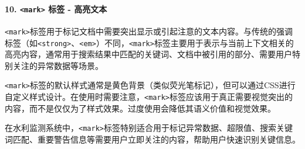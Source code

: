 \paragraph{\texorpdfstring{10. \texttt{\textless{}mark\textgreater{}} 标签 - 高亮文本}{10. \textless mark\textgreater{} 标签 - 高亮文本}}\label{mark-ux6807ux7b7e---ux9ad8ux4eaeux6587ux672c}

\texttt{\textless{}mark\textgreater{}}标签用于标记文档中需要突出显示或引起注意的文本内容。与传统的强调标签（如\texttt{\textless{}strong\textgreater{}}、\texttt{\textless{}em\textgreater{}}）不同，\texttt{\textless{}mark\textgreater{}}标签主要用于表示与当前上下文相关的高亮内容，通常用于搜索结果中匹配的关键词、文档中被引用的部分、需要用户特别关注的异常数据等场景。

\texttt{\textless{}mark\textgreater{}}标签的默认样式通常是黄色背景（类似荧光笔标记），但可以通过CSS进行自定义样式设计。在使用时需要注意，\texttt{\textless{}mark\textgreater{}}标签应该用于真正需要视觉突出的内容，而不是仅仅为了样式效果。过度使用会降低其语义价值和视觉效果。

在水利监测系统中，\texttt{\textless{}mark\textgreater{}}标签特别适合用于标记异常数据、超限值、搜索关键词匹配、重要警告信息等需要用户立即关注的内容，帮助用户快速识别关键信息。

\begin{Shaded}
\begin{Highlighting}[]
\DataTypeTok{\textless{}}\DataTypeTok{\textgreater{}}\DataTypeTok{\textless{}}\OperatorTok{=}\DataTypeTok{\textgreater{}}\DataTypeTok{\textless{}/}\DataTypeTok{\textgreater{}}\DataTypeTok{\textless{}/}\DataTypeTok{\textgreater{}}

\DataTypeTok{\textless{}}\DataTypeTok{\textgreater{}}\DataTypeTok{\textless{}}\OperatorTok{=}\DataTypeTok{\textgreater{}}\DataTypeTok{\textless{}/}\DataTypeTok{\textgreater{}\textless{}/}\DataTypeTok{\textgreater{}}

\DataTypeTok{\textless{}}\DataTypeTok{\textgreater{}}\DataTypeTok{\textless{}}\DataTypeTok{\textgreater{}}\DataTypeTok{\textless{}/}\DataTypeTok{\textgreater{}}\DataTypeTok{\textless{}/}\DataTypeTok{\textgreater{}}

\DataTypeTok{\textless{}}\DataTypeTok{\textgreater{}}\DataTypeTok{\textless{}}\OperatorTok{=}\DataTypeTok{\textgreater{}}\DataTypeTok{\textless{}/}\DataTypeTok{\textgreater{}}\DataTypeTok{\textless{}/}\DataTypeTok{\textgreater{}}
\end{Highlighting}
\end{Shaded}

